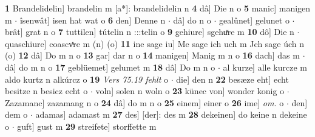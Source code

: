 \documentclass[8pt,a4paper,notitlepage]{article}
\begin{document}
\begin{table}[ht]
\begin{minipage}[t]{0.5\linewidth}
\textbf{1} Brandelidelin] brandelin m [a*]: brandelidelin n \textbf{4} dâ] Die n o \textbf{5} manic] manigen m  $\cdot$ îsenwât] isen hat wat o \textbf{6} den] Denne n  $\cdot$ dâ] do n o  $\cdot$ gealûnet] gelunet o  $\cdot$ brât] grat n o \textbf{7} tuttilen] tútelin n :::telin o \textbf{9} gehiure] sgehuͯre m \textbf{10} dô] Die n  $\cdot$ quaschiure] coascvͯre m (n) (o) \textbf{11} ine sage iu] Me sage ich uch m Jch sage úch n (o) \textbf{12} dâ] Do m n o \textbf{13} gar] dar n o \textbf{14} manigen] Manig m n o \textbf{16} dach] das m  $\cdot$ dâ] do m n o \textbf{17} geblüemet] gelumet m \textbf{18} dâ] Do m n o  $\cdot$ al kurze] alle kurcze m aldo kurtz n alkúrcz o \textbf{19} \textit{Vers 75.19 fehlt} o   $\cdot$ die] den n \textbf{22} besæze eht] echt besitze n besicz echt o  $\cdot$ voln] solen n woln o \textbf{23} künec von] wonder konig o  $\cdot$ Zazamanc] zazamang n o \textbf{24} dâ] do m n o \textbf{25} einem] einer o \textbf{26} ime] \textit{om.} o  $\cdot$ den] dem o  $\cdot$ adamas] adamast m \textbf{27} des] [der]: des m \textbf{28} dekeinen] do keine n dekeine o  $\cdot$ guft] gust m \textbf{29} streifete] storffette m \newline
\end{minipage}
\end{table}
\newpage
\end{document}
